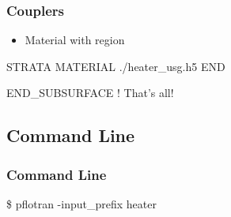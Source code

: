 \documentclass{beamer}
\newcommand\bluecomment[1]{{{\color{blue} #1}}}
\begin{document}
\begin{frame}[fragile]\frametitle{Couplers}

\begin{itemize}
  \item{Material with region}
\end{itemize}

\begin{semiverbatim}
STRATA
  MATERIAL ./heater_usg.h5
END

END_SUBSURFACE \bluecomment{! That's all!}
\end{semiverbatim}
\end{frame}

\subsection{Command Line}
\begin{frame}[fragile]\frametitle{Command Line}
\begin{semiverbatim}
\$ pflotran -input_prefix heater
\end{semiverbatim}

\end{frame}

\end{document}
